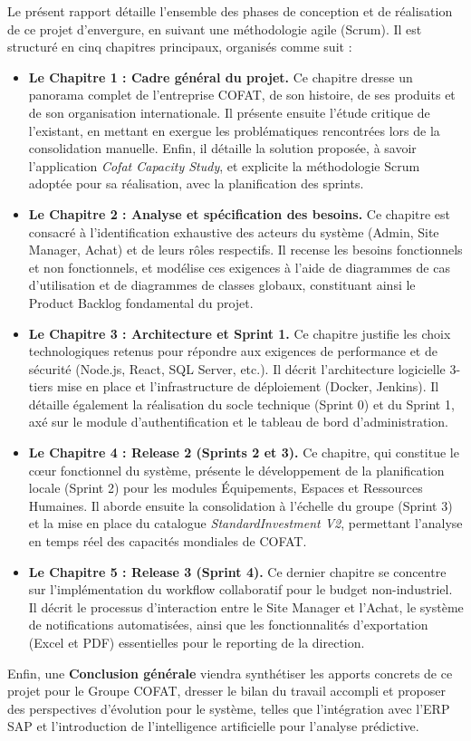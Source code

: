 Le présent rapport détaille l'ensemble des phases de conception et de réalisation de ce projet d'envergure, en suivant une méthodologie agile (Scrum). Il est structuré en cinq chapitres principaux, organisés comme suit :

\begin{itemize}
    \item \textbf{Le Chapitre 1 : Cadre général du projet.} Ce chapitre dresse un panorama complet de l'entreprise COFAT, de son histoire, de ses produits et de son organisation internationale. Il présente ensuite l'étude critique de l'existant, en mettant en exergue les problématiques rencontrées lors de la consolidation manuelle. Enfin, il détaille la solution proposée, à savoir l'application \textit{Cofat Capacity Study}, et explicite la méthodologie Scrum adoptée pour sa réalisation, avec la planification des sprints.
    
    \item \textbf{Le Chapitre 2 : Analyse et spécification des besoins.} Ce chapitre est consacré à l'identification exhaustive des acteurs du système (Admin, Site Manager, Achat) et de leurs rôles respectifs. Il recense les besoins fonctionnels et non fonctionnels, et modélise ces exigences à l'aide de diagrammes de cas d'utilisation et de diagrammes de classes globaux, constituant ainsi le Product Backlog fondamental du projet.
    
    \item \textbf{Le Chapitre 3 : Architecture et Sprint 1.} Ce chapitre justifie les choix technologiques retenus pour répondre aux exigences de performance et de sécurité (Node.js, React, SQL Server, etc.). Il décrit l'architecture logicielle 3-tiers mise en place et l'infrastructure de déploiement (Docker, Jenkins). Il détaille également la réalisation du socle technique (Sprint 0) et du Sprint 1, axé sur le module d'authentification et le tableau de bord d'administration.
    
    \item \textbf{Le Chapitre 4 : Release 2 (Sprints 2 et 3).} Ce chapitre, qui constitue le cœur fonctionnel du système, présente le développement de la planification locale (Sprint 2) pour les modules Équipements, Espaces et Ressources Humaines. Il aborde ensuite la consolidation à l'échelle du groupe (Sprint 3) et la mise en place du catalogue \textit{StandardInvestment V2}, permettant l'analyse en temps réel des capacités mondiales de COFAT.
    
    \item \textbf{Le Chapitre 5 : Release 3 (Sprint 4).} Ce dernier chapitre se concentre sur l'implémentation du workflow collaboratif pour le budget non-industriel. Il décrit le processus d'interaction entre le Site Manager et l'Achat, le système de notifications automatisées, ainsi que les fonctionnalités d'exportation (Excel et PDF) essentielles pour le reporting de la direction.
\end{itemize}

Enfin, une \textbf{Conclusion générale} viendra synthétiser les apports concrets de ce projet pour le Groupe COFAT, dresser le bilan du travail accompli et proposer des perspectives d'évolution pour le système, telles que l'intégration avec l'ERP SAP et l'introduction de l'intelligence artificielle pour l'analyse prédictive.
